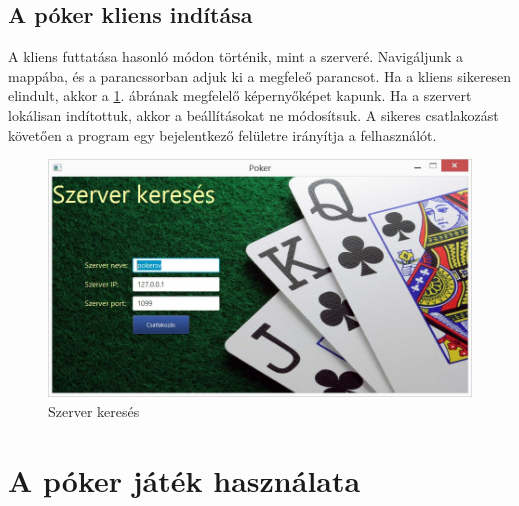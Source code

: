 \subsection{A póker kliens indítása}
A kliens futtatása hasonló módon történik, mint a szerveré. Navigáljunk a  mappába, és a parancssorban adjuk ki a megfeleő parancsot. Ha a kliens sikeresen elindult, akkor a \ref{fig:server_search}. ábrának megfelelő képernyőképet kapunk. Ha a szervert lokálisan indítottuk, akkor a beállításokat ne módosítsuk. A sikeres csatlakozást követően a program egy bejelentkező felületre irányítja a felhasználót. \\

\begin{figure}[h!]
  \caption{Szerver keresés}
  \label{fig:server_search}
  \centering
    \includegraphics[width=\linewidth]{user-documentation/images/server-search.jpg}
\end{figure}

\section{A póker játék használata}

